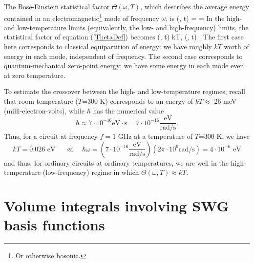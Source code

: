 \documentclass[letterpaper]{article}
\begin{document}
The Bose-Einstein statistical factor $\Theta(\omega , T)$, 
which describes the average energy contained in an 
electromagnetic\footnote{Or otherwise bosonic.} 
mode of frequency $\omega$, is 
{
 \Theta(\omega, t)
 =\hbar \omega
= \coth{}
}
In the high- and low-temperature limits (equivalently, the low- and 
high-frequency) limits, the statistical factor of equation (\ref{ThetaDef}) 
becomes
{
  \Theta(\omega, t) kT, 
  \qquad
  \Theta(\omega, t) .
}
The first case here corresponds to classical equipartition of energy: 
we have roughly $kT$ worth of energy in each mode, independent of 
frequency. The second case corresponds to quantum-mechanical zero-point
energy; we have some energy in each mode even at zero temperature.

To estimate the crossover between the high- and low-temperature
regimes, recall that room temperature ($T$=300 K) corresponds to 
an energy of $kT \approx $ 26 meV (milli-electron-volts), while 
$\hbar$ has the numerical value
$$ \hbar 
   \approx 7\cdot 10^{-16} \text{eV}\cdot \text{s}
  = 7\cdot{10^{-16}} \frac{\text{eV}}{\text{rad/s}}.
$$
Thus, for a circuit at frequency $f=1$ GHz at a temperature of $T$=300 K,
we have 
$$ kT = 0.026 \text{ eV } \quad \ll \quad \hbar\omega 
      = \left( 7\cdot 10^{-16} \frac{\text{eV}}{\text{rad/s}} \right)
        \left( 2\pi \cdot 10^9 \text{rad/s} \right)
      = 4 \cdot 10^{-6}\text{ eV}
$$
and thus, for ordinary circuits at ordinary temperatures, we are 
well in the high-temperature (low-frequency) regime in which
$\Theta(\omega,T)\approx kT$.

\newpage
\section{Volume integrals involving SWG basis functions}
\label{VolumeIntegralAppendix}
\end{document}
